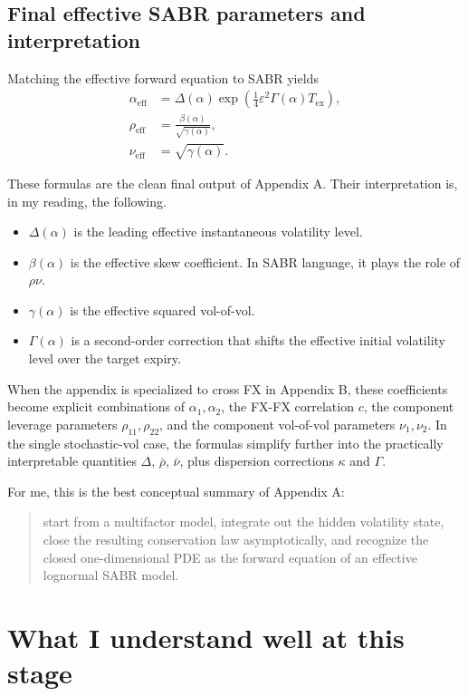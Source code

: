 \documentclass[11pt]{article}
\newcommand{\eps}{\varepsilon}
\begin{document}
\subsection{Final effective SABR parameters and interpretation}

Matching the effective forward equation to SABR yields
\begin{align}
\alpha_{\mathrm{eff}} &= \Delta(\alpha)\exp\!\left(\frac14\eps^2\Gamma(\alpha)T_{\mathrm{ex}}\right), \\
\rho_{\mathrm{eff}} &= \frac{\beta(\alpha)}{\sqrt{\gamma(\alpha)}}, \\
\nu_{\mathrm{eff}} &= \sqrt{\gamma(\alpha)}.
\end{align}

These formulas are the clean final output of Appendix A. Their interpretation is, in my reading, the following.
\begin{itemize}
    \item \(\Delta(\alpha)\) is the leading effective instantaneous volatility level.
    \item \(\beta(\alpha)\) is the effective skew coefficient. In SABR language, it plays the role of \(\rho\nu\).
    \item \(\gamma(\alpha)\) is the effective squared vol-of-vol.
    \item \(\Gamma(\alpha)\) is a second-order correction that shifts the effective initial volatility level over the target expiry.
\end{itemize}

When the appendix is specialized to cross FX in Appendix B, these coefficients become explicit combinations of \(\alpha_1,\alpha_2\), the FX-FX correlation \(c\), the component leverage parameters \(\rho_{11},\rho_{22}\), and the component vol-of-vol parameters \(\nu_1,\nu_2\). In the single stochastic-vol case, the formulas simplify further into the practically interpretable quantities \(\Delta\), \(\bar\rho\), \(\bar\nu\), plus dispersion corrections \(\kappa\) and \(\Gamma\).

For me, this is the best conceptual summary of Appendix A:
\begin{quote}
start from a multifactor model, integrate out the hidden volatility state, close the resulting conservation law asymptotically, and recognize the closed one-dimensional PDE as the forward equation of an effective lognormal SABR model.
\end{quote}

\section{What I understand well at this stage}
\end{document}
